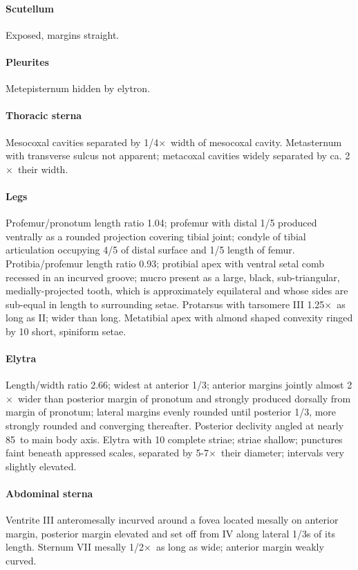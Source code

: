 \documentclass[fleqn,10pt,lineno]{wlpeerj} %
\newcommand{\td}{\textdegree~}
\newcommand{\x}{$\times$~}
\begin{document}
			\paragraph{Scutellum}
				Exposed, margins straight.
			\paragraph{Pleurites}
				Metepisternum hidden by elytron.
			\paragraph{Thoracic sterna}
				Mesocoxal cavities separated by 1/4\x width of mesocoxal cavity. 
				Metasternum with transverse sulcus not apparent; metacoxal cavities widely separated by ca. 2\x their width.
			\paragraph{Legs}
				Profemur/pronotum length ratio 1.04; profemur with distal 1/5 produced ventrally as a rounded projection covering tibial joint; condyle of tibial articulation occupying 4/5 of distal surface and 1/5 length of femur. 
				Protibia/profemur length ratio 0.93; protibial apex with ventral setal comb recessed in an incurved groove; mucro present as a large, black, sub-triangular, medially-projected tooth, which is approximately equilateral and whose sides are sub-equal in length to surrounding setae. 
				Protarsus with tarsomere III 1.25\x as long as II; wider than long. 
				Metatibial apex with almond shaped convexity ringed by 10 short, spiniform setae.
			\paragraph{Elytra}
				Length/width ratio 2.66; widest at anterior 1/3; anterior margins jointly almost 2\x wider than posterior margin of pronotum and strongly produced dorsally from margin of pronotum; lateral margins evenly rounded until posterior 1/3, more strongly rounded and converging thereafter. 
				Posterior declivity angled at nearly 85\td to main body axis. Elytra with 10 complete striae; striae shallow; punctures faint beneath appressed scales, separated by 5-7\x their diameter; intervals very slightly elevated.
			\paragraph{Abdominal sterna}
				Ventrite III anteromesally incurved around a fovea located mesally on anterior margin, posterior margin elevated and set off from IV along lateral 1/3s of its length. 
				Sternum VII mesally 1/2\x as long as wide; anterior margin weakly curved.
\end{document}
